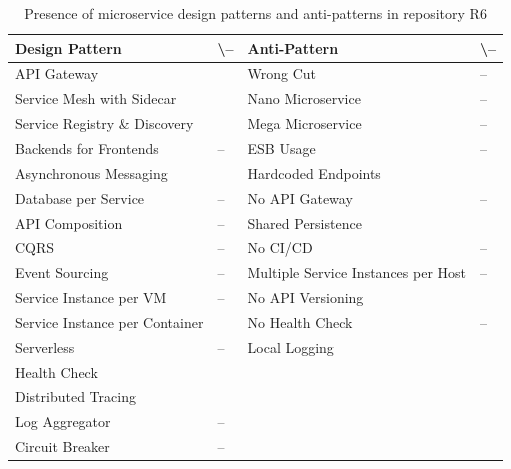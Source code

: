 \documentclass{Configuration_Files/PoliMi3i_thesis}
\newcommand{\cmark}{\ding{51}}%
\begin{document}
\begin{table}[H]
\centering 
    \begin{tabular}{ 
  | >{\centering\arraybackslash} m{16em} 
  | >{\centering\arraybackslash} m{2.2em} 
  | >{\centering\arraybackslash} m{16em} 
  | >{\centering\arraybackslash} m{2.2em} | }
    \hline
    \rowcolor{bluepoli!40}
    \textbf{Design Pattern} & \cmark \textbackslash – & \textbf{Anti-Pattern} & \cmark \textbackslash – \T\B \\
    \hline \hline
    API Gateway & \cmark & Wrong Cut & – \T\B\\
    \hline
    \rowcolor{bluepoli!10}
    Service Mesh with Sidecar & \cmark & Nano Microservice & – \T\B \\
    \hline
    Service Registry \& Discovery & \cmark & Mega Microservice & – \T\B \\
    \hline
    \rowcolor{bluepoli!10}
    Backends for Frontends & – & ESB Usage & – \T\B \\
    \hline
    Asynchronous Messaging & \cmark & Hardcoded Endpoints & \cmark \T\B \\
    \hline
    \rowcolor{bluepoli!10}
    Database per Service & – & No API Gateway & – \T\B \\
    \hline
    API Composition & – & Shared Persistence & \cmark \T\B \\
    \hline
    \rowcolor{bluepoli!10}
    CQRS & – & No CI/CD & – \T\B \\
    \hline
    Event Sourcing & – & Multiple Service Instances per Host & – \T\B \\
    \hline
    \rowcolor{bluepoli!10}
    Service Instance per VM & – & No API Versioning & \cmark \T\B \\
    \hline
    Service Instance per Container & \cmark & No Health Check & – \T\B \\
    \hline
    \rowcolor{bluepoli!10}
    Serverless & – & Local Logging & \cmark \T\B \\
    \hline
    Health Check & \cmark &  & \T\B \\
    \hline
    \rowcolor{bluepoli!10}
    Distributed Tracing & \cmark & & \T\B \\
    \hline
    Log Aggregator & – &  & \T\B \\
    \hline
    \rowcolor{bluepoli!10}
    Circuit Breaker & – &  & \T\B \\
    \hline
    \end{tabular}
    \\[10pt]
    \caption{Presence of microservice design patterns and anti-patterns in repository R6}
    \label{table:R6_result}
\end{table}
\end{document}
